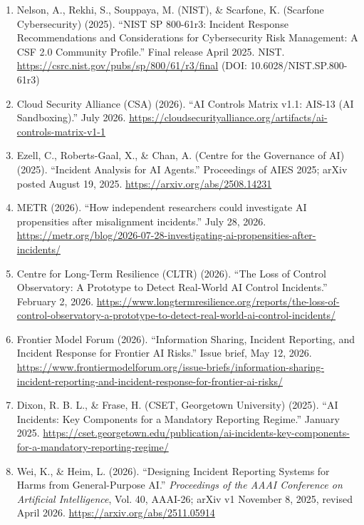 \documentclass[10pt]{article}
\begin{document}
{\begin{enumerate}[leftmargin=1.6em, itemsep=1pt, topsep=2pt, parsep=0pt]
  Incident Response Framework V1.0.'' Released November 18, 2025.
  \url{https://github.com/cosai-oasis/ws2-defenders/blob/main/incident-response/AI-Incident-Response.md}
\item Nelson, A., Rekhi, S., Souppaya, M. (NIST), \& Scarfone, K. (Scarfone
  Cybersecurity) (2025). ``NIST SP 800-61r3: Incident Response
  Recommendations and Considerations for Cybersecurity Risk Management: A
  CSF 2.0 Community Profile.'' Final release April 2025. NIST.
  \url{https://csrc.nist.gov/pubs/sp/800/61/r3/final} (DOI:
  10.6028/NIST.SP.800-61r3)
\item Cloud Security Alliance (CSA) (2026). ``AI Controls Matrix v1.1:
  AIS-13 (AI Sandboxing).'' July 2026.
  \url{https://cloudsecurityalliance.org/artifacts/ai-controls-matrix-v1-1}
\item Ezell, C., Roberts-Gaal, X., \& Chan, A. (Centre for the Governance of
  AI) (2025). ``Incident Analysis for AI Agents.'' Proceedings of AIES 2025;
  arXiv posted August 19, 2025. \url{https://arxiv.org/abs/2508.14231}
\item METR (2026). ``How independent researchers could investigate AI
  propensities after misalignment incidents.'' July 28, 2026.
  \url{https://metr.org/blog/2026-07-28-investigating-ai-propensities-after-incidents/}
\item Centre for Long-Term Resilience (CLTR) (2026). ``The Loss of Control
  Observatory: A Prototype to Detect Real-World AI Control Incidents.''
  February 2, 2026.
  \url{https://www.longtermresilience.org/reports/the-loss-of-control-observatory-a-prototype-to-detect-real-world-ai-control-incidents/}
\item Frontier Model Forum (2026). ``Information Sharing, Incident
  Reporting, and Incident Response for Frontier AI Risks.'' Issue brief, May
  12, 2026.
  \url{https://www.frontiermodelforum.org/issue-briefs/information-sharing-incident-reporting-and-incident-response-for-frontier-ai-risks/}
\item Dixon, R. B. L., \& Frase, H. (CSET, Georgetown University) (2025).
  ``AI Incidents: Key Components for a Mandatory Reporting Regime.'' January
  2025.
  \url{https://cset.georgetown.edu/publication/ai-incidents-key-components-for-a-mandatory-reporting-regime/}
\item Wei, K., \& Heim, L. (2026). ``Designing Incident Reporting Systems
  for Harms from General-Purpose AI.'' \emph{Proceedings of the AAAI
  Conference on Artificial Intelligence}, Vol. 40, AAAI-26; arXiv v1
  November 8, 2025, revised April 2026.
  \url{https://arxiv.org/abs/2511.05914}
\end{enumerate}

}
\end{document}
